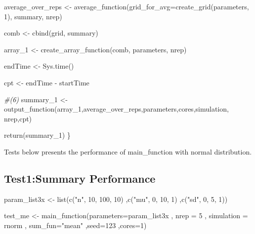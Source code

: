 \documentclass[11pt,a4paper]{article}
\newenvironment{Shaded}{\begin{snugshade}}{\end{snugshade}}
\newcommand{\AttributeTok}[1]{\textcolor[rgb]{0.77,0.63,0.00}{#1}}
\newcommand{\CommentTok}[1]{\textcolor[rgb]{0.56,0.35,0.01}{\textit{#1}}}
\newcommand{\DecValTok}[1]{\textcolor[rgb]{0.00,0.00,0.81}{#1}}
\newcommand{\FunctionTok}[1]{\textcolor[rgb]{0.00,0.00,0.00}{#1}}
\newcommand{\NormalTok}[1]{#1}
\newcommand{\OtherTok}[1]{\textcolor[rgb]{0.56,0.35,0.01}{#1}}
\newcommand{\SpecialCharTok}[1]{\textcolor[rgb]{0.00,0.00,0.00}{#1}}
\newcommand{\StringTok}[1]{\textcolor[rgb]{0.31,0.60,0.02}{#1}}
\begin{document}
\begin{Shaded}
\begin{Highlighting}[]
\NormalTok{  average\_over\_reps }\OtherTok{\textless{}{-}} \FunctionTok{average\_function}\NormalTok{(}\AttributeTok{grid\_for\_avg=}\FunctionTok{create\_grid}\NormalTok{(parameters, }\DecValTok{1}\NormalTok{), summary, nrep)}
  
\NormalTok{  comb }\OtherTok{\textless{}{-}} \FunctionTok{cbind}\NormalTok{(grid, summary) }
  
\NormalTok{  array\_1 }\OtherTok{\textless{}{-}} \FunctionTok{create\_array\_function}\NormalTok{(comb, parameters, nrep) }
  
\NormalTok{  endTime }\OtherTok{\textless{}{-}} \FunctionTok{Sys.time}\NormalTok{()}
  
\NormalTok{  cpt }\OtherTok{\textless{}{-}}\NormalTok{ endTime }\SpecialCharTok{{-}}\NormalTok{ startTime}
  
  \CommentTok{\#(6)}
\NormalTok{  summary\_1 }\OtherTok{\textless{}{-}} \FunctionTok{output\_function}\NormalTok{(array\_1,average\_over\_reps,parameters,cores,simulation,}
\NormalTok{                           nrep,cpt)}
  
\FunctionTok{return}\NormalTok{(summary\_1)}
\NormalTok{\}}
\end{Highlighting}
\end{Shaded}

Tests below presents the performance of main\_function with normal
distribution.

\hypertarget{test1summary-performance}{%
\subsection{Test1:Summary Performance}\label{test1summary-performance}}

\begin{Shaded}
\begin{Highlighting}[]
\NormalTok{param\_list3x }\OtherTok{\textless{}{-}} \FunctionTok{list}\NormalTok{(}\FunctionTok{c}\NormalTok{(}\StringTok{"n"}\NormalTok{, }\DecValTok{10}\NormalTok{, }\DecValTok{100}\NormalTok{, }\DecValTok{10}\NormalTok{)}
\NormalTok{                     ,}\FunctionTok{c}\NormalTok{(}\StringTok{"mu"}\NormalTok{, }\DecValTok{0}\NormalTok{, }\DecValTok{10}\NormalTok{, }\DecValTok{1}\NormalTok{)}
\NormalTok{                     ,}\FunctionTok{c}\NormalTok{(}\StringTok{"sd"}\NormalTok{, }\DecValTok{0}\NormalTok{, }\DecValTok{5}\NormalTok{, }\DecValTok{1}\NormalTok{))}

\NormalTok{test\_me }\OtherTok{\textless{}{-}} \FunctionTok{main\_function}\NormalTok{(}\AttributeTok{parameters=}\NormalTok{param\_list3x}
\NormalTok{              , }\AttributeTok{nrep =} \DecValTok{5}
\NormalTok{              , }\AttributeTok{simulation =}\NormalTok{ rnorm}
\NormalTok{              , }\AttributeTok{sum\_fun=}\StringTok{"mean"}
\NormalTok{              ,}\AttributeTok{seed=}\DecValTok{123} 
\NormalTok{              ,}\AttributeTok{cores=}\DecValTok{1}\NormalTok{)}
\end{Highlighting}
\end{Shaded}
\end{document}
